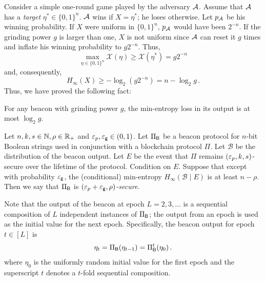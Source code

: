 Consider a simple one-round game played by the adversary $\mathcal{A}$. 
Assume that $\mathcal{A}$ has a \emph{target} $\eta^* \in \{0,1\}^n$. 
$\mathcal{A}$ wins if $X = \eta^*$; he loses otherwise. 
Let $p_{\mathcal{A}}$ be his winning probability. 
If $X$ were uniform in $\{0,1\}^n$, 
$p_{\mathcal{A}}$ would have been $2^{-n}$. 
If the grinding power $g$ is larger than one, 
$X$ is not uniform since 
$\mathcal{A}$ can reset it $g$ times 
and inflate his winning probability to $g 2^{-n}$. 
Thus, 
$$ 
    \max_{\eta \in \{0,1\}^n} \mathcal{X}(\eta) \geq \mathcal{X}(\eta^*) = g 2^{-n}
$$ 
and, consequently, 
$$
    H_\infty(X) \geq -\log_2 (g 2^{-n}) = n - \log_2 g
    \,.
$$
Thus, we have proved the following fact:

\begin{fact}\label{fact:min-entropy-grinding-power}
  For any beacon with grinding power $g$, 
  the min-entropy loss in its output is at most $\log_2 g$.
\end{fact}

\begin{definition}\label{def:beacon-security}
    Let $n,k,s \in \mathbb{N}, \rho \in \mathbb{R}_+$ and $\mathsf{\varepsilon}_p, \mathsf{\varepsilon_g} \in (0,1)$.
    Let $\Pi_{\mathsf{B}}$ be a beacon protocol for $n$-bit Boolean strings 
    used in conjunction with a blockchain protocol $\Pi$. 
    Let $\mathcal{B}$ be the distribution of the beacon output.
    Let $E$ be the event that $\Pi$ remains $(\mathsf{\varepsilon}_p, k, s)$-secure over the lifetime of the protocol. 
    Condition on $E$. 
    Suppose that except with probability $\mathsf{\varepsilon_g}$, 
    the (conditional) min-entropy 
    $H_\infty(\mathcal{B} \mid E)$ is at least $n - \rho$. 
    Then we say that $\Pi_{\mathsf{B}}$ is \emph{$(\mathsf{\varepsilon}_p + \mathsf{\varepsilon_g}, \rho)$-secure}.
\end{definition}



Note that the output of the beacon at epoch $L = 2, 3, \ldots$  
is a sequential composition of $L$ independent instances of $\Pi_{\mathsf{B}}$; 
the output from an epoch is used as the initial value for the next epoch. 
Specifically, 
the beacon output for epoch $t \in [L]$ is 
\begin{align}\label{eq:beacon-iterated}
    \eta_t = \Pi_{\mathsf{B}}(\eta_{t-1}) = \Pi_{\mathsf{B}}^t(\eta_0)\,.
\end{align}
where $\eta_0$ is the uniformly random initial value for the first epoch 
and the superscript $t$ denotes a $t$-fold sequential composition.


